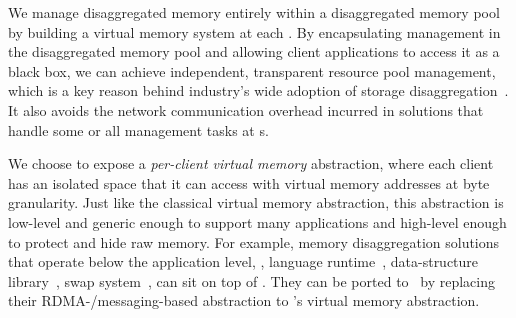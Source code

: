 We manage disaggregated memory entirely within a disaggregated memory pool by building a virtual memory system at each \MN.
By encapsulating management in the disaggregated memory pool and allowing client applications to
access it as a black box,
we can achieve independent, transparent resource pool management,
which is a key reason behind industry's wide adoption of storage disaggregation~\cite{FACEBOOK-BRYCECANYON,FB1,SnowFlake-NSDI20,Ali-SinglesDay}. %
It also avoids the network communication overhead incurred in solutions that handle some or all management tasks at \CN{}s.

We choose to expose a {\em per-client virtual memory} abstraction,
where each client has an isolated space that it can access with virtual memory addresses at byte granularity.
Just like the classical virtual memory abstraction, this abstraction is low-level and generic enough to support many applications
and high-level enough to protect and hide raw memory. 
For example, memory disaggregation solutions that operate below the application level,
\eg, language runtime~\cite{Semeru}, data-structure library~\cite{AIFM}, swap system~\cite{InfiniSwap,FastSwap}, %
can sit on top of \sys. %
They can be ported to \sys\ by replacing their RDMA-/messaging-based abstraction to \sys's virtual memory abstraction. %

